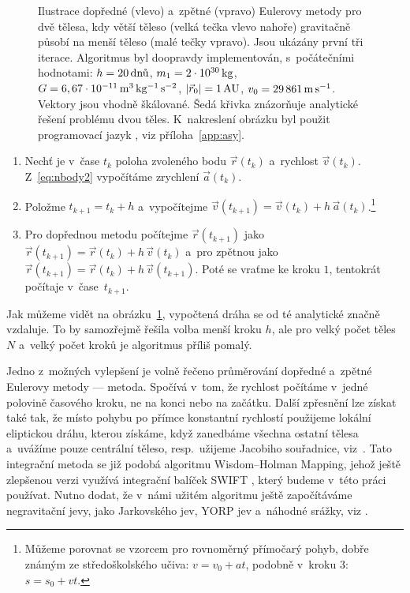 \documentclass[A4paper, 12pt, oneside]{book}
\begin{document}
\begin{figure} 
	\centering 
	\begin{subfigure}[b]{0.45\textwidth}
	\end{subfigure}
	\begin{subfigure}[b]{0.45\textwidth}
	\end{subfigure}
	\caption{Ilustrace dopředné (vlevo) a~zpětné (vpravo) Eulerovy metody pro dvě tělesa, kdy větší těleso (velká tečka vlevo nahoře) gravitačně působí na menší těleso (malé tečky vpravo). Jsou ukázány první tři iterace. Algoritmus byl doopravdy implementován, s~počátečními hodnotami: $h=20\,{\rm \text{dnů}}$, $m_1=2\cdot10^{30}\,{\rm kg}$, $G=6,67\cdot10^{-11}\,{\rm m^3\,kg^{-1}\,s^{-2}}$, $|\vec{r}_0|=1\,{\rm AU}$, $v_0=29\,861\,{\rm m\,s^{-1}}$. Vektory jsou vhodně škálované. Šedá křivka znázorňuje analytické řešení problému dvou těles. K~nakreslení obrázku byl použit programovací jazyk , viz příloha~\ref{app:asy}.} \label{fig:euler}
\end{figure}
\pagebreak
\begin{enumerate}
	\item Nechť je v~čase $t_k$ poloha zvoleného bodu $\vec{r}(t_k)$ a~rychlost $\vec{v}(t_k)$. Z~\eqref{eq:nbody2} vypočítáme zrychlení $\vec{a}(t_k)$. 
	\item Položme $t_{k+1} = t_{k}+h$ a~vypočítejme $\vec{v}(t_{k+1}) = \vec{v}(t_k) + h\,\vec{a}(t_k)$.\footnote{Můžeme porovnat se vzorcem pro rovnoměrný přímočarý pohyb, dobře známým ze středoškolského učiva: $v = v_0 + at$, podobně v~kroku $3$: $s = s_0 + vt$.}
	\item Pro dopřednou metodu počítejme $\vec{r}(t_{k+1})$ jako $\vec{r}(t_{k+1}) = \vec{r}(t_k) + h\,\vec{v}(t_k)$ a~pro zpětnou jako $\vec{r}(t_{k+1}) = \vec{r}(t_k) + h\,\vec{v}(t_{k+1})$. Poté se vraťme ke kroku $1$, tentokrát počítaje v~čase~$t_{k+1}$. 
\end{enumerate}

Jak můžeme vidět na obrázku~\ref{fig:euler}, vypočtená dráha se od té analytické značně vzdaluje. To by samozřejmě řešila volba menší kroku $h$, ale pro velký počet těles $N$ a~velký počet kroků je algoritmus příliš pomalý.

Jedno z~možných vylepšení je volně řečeno průměrování dopředné a~zpětné Eulerovy metody ---  metoda. Spočívá v~tom, že rychlost počítáme v~jedné polovině časového kroku, ne na konci nebo na začátku. Další zpřesnění lze získat také tak, že místo pohybu po přímce konstantní rychlostí použijeme lokální eliptickou dráhu, kterou získáme, když zanedbáme všechna ostatní tělesa a~uvážíme pouze centrální těleso, resp.\ užijeme Jacobiho souřadnice, viz~\cite{wisdom91}. Tato integrační metoda se již podobá algoritmu Wisdom--Holman Mapping, jehož ještě zlepšenou verzi využívá integrační balíček SWIFT \cite{levison94}, který budeme v~této práci používat. Nutno dodat, že v~námi užitém algoritmu ještě započítáváme negravitační jevy, jako Jarkovského jev, YORP jev a~náhodné srážky, viz \cite{broz11}.
\end{document}
